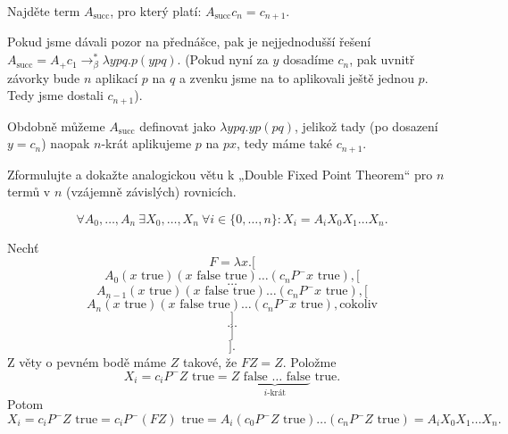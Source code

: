 \documentclass[12pt]{article}					%
\begin{document}
	\begin{priklad}[13d]
		Najděte term $A_{\text{succ}}$, pro který platí: $A_{\text{succ}} c_n = c_{n+1}$.

		\begin{reseni}
			Pokud jsme dávali pozor na přednášce, pak je nejjednodušší řešení $A_{\text{succ}} = A_+c_1 \rightarrow_β^* λypq.p(ypq)$. (Pokud nyní za $y$ dosadíme $c_n$, pak uvnitř závorky bude $n$ aplikací $p$ na $q$ a zvenku jsme na to aplikovali ještě jednou $p$. Tedy jsme dostali $c_{n+1}$).

			Obdobně můžeme $A_{\text{succ}}$ definovat jako $λypq.yp(pq)$, jelikož tady (po dosazení $y = c_n$) naopak $n$-krát aplikujeme $p$ na $px$, tedy máme také $c_{n+1}$.
		\end{reseni}
	\end{priklad}
\pagebreak
	\begin{priklad}[14a]
		Zformulujte a dokažte analogickou větu k „Double Fixed Point Theorem“ pro $n$ termů v $n$ (vzájemně závislých) rovnicích.

		\begin{reseni}
			$$ \forall A_0, …, A_n\ \exists X_0, …, X_n\ \forall i \in \{0, …, n\}: X_i = A_i X_0 X_1 … X_n. $$
		\end{reseni}

		\begin{dukazin}
			Nechť
			$$ F = λx.[$$
			$$ A_0 (x \text{ true})(x \text{ false} \text{ true})…(c_n P^- x \text{ true}), [ $$
			$$ … $$
			$$ A_{n-1} (x \text{ true})(x \text{ false} \text{ true})…(c_n P^- x \text{ true}), [ $$
			$$ A_n (x \text{ true})(x \text{ false} \text{ true})…(c_n P^- x \text{ true}), \text{cokoliv} $$
			$$ ] $$
			$$ … $$
			$$ ] $$
			$$ ]. $$
			Z věty o pevném bodě máme $Z$ takové, že $FZ = Z$. Položme
			$$ X_i = c_i P^- Z \text{ true} = Z \underbrace{\text{ false } … \text{ false}}_{i\text{-krát}} \text{ true}. $$
			Potom
			$$ X_i = c_i P^- Z \text{ true} = c_i P^- (FZ) \text{ true} = A_i (c_0 P^- Z \text{ true})…(c_n P^- Z \text{ true}) = A_i X_0 X_1 … X_n. $$
		\end{dukazin}
	\end{priklad}
\end{document}
